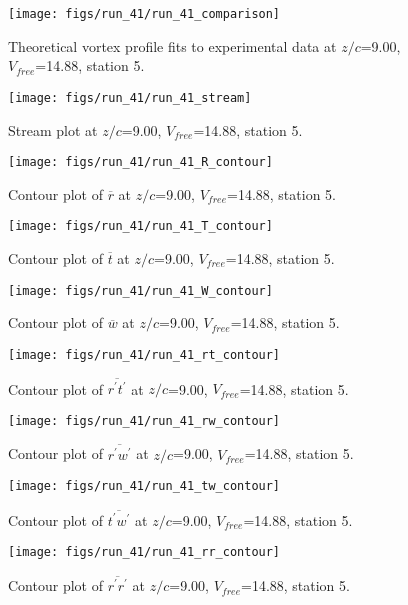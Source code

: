 \begin{figure}[H]
\centering
\texttt{[image: figs/run\_41/run\_41\_comparison]}
\caption{Theoretical vortex profile fits to experimental data at $z/c$=9.00, $V_{free}$=14.88, station 5.}
\end{figure}


\begin{figure}[H]
\centering
\texttt{[image: figs/run\_41/run\_41\_stream]}
\caption{Stream plot at $z/c$=9.00, $V_{free}$=14.88, station 5.}
\end{figure}


\begin{figure}[H]
\centering
\texttt{[image: figs/run\_41/run\_41\_R\_contour]}
\caption{Contour plot of $\overline{r}$ at $z/c$=9.00, $V_{free}$=14.88, station 5.}
\end{figure}


\begin{figure}[H]
\centering
\texttt{[image: figs/run\_41/run\_41\_T\_contour]}
\caption{Contour plot of $\overline{t}$ at $z/c$=9.00, $V_{free}$=14.88, station 5.}
\end{figure}


\begin{figure}[H]
\centering
\texttt{[image: figs/run\_41/run\_41\_W\_contour]}
\caption{Contour plot of $\overline{w}$ at $z/c$=9.00, $V_{free}$=14.88, station 5.}
\end{figure}


\begin{figure}[H]
\centering
\texttt{[image: figs/run\_41/run\_41\_rt\_contour]}
\caption{Contour plot of $\overline{r^\prime t^\prime}$ at $z/c$=9.00, $V_{free}$=14.88, station 5.}
\end{figure}


\begin{figure}[H]
\centering
\texttt{[image: figs/run\_41/run\_41\_rw\_contour]}
\caption{Contour plot of $\overline{r^\prime w^\prime}$ at $z/c$=9.00, $V_{free}$=14.88, station 5.}
\end{figure}


\begin{figure}[H]
\centering
\texttt{[image: figs/run\_41/run\_41\_tw\_contour]}
\caption{Contour plot of $\overline{t^\prime w^\prime}$ at $z/c$=9.00, $V_{free}$=14.88, station 5.}
\end{figure}


\begin{figure}[H]
\centering
\texttt{[image: figs/run\_41/run\_41\_rr\_contour]}
\caption{Contour plot of $\overline{r^\prime r^\prime}$ at $z/c$=9.00, $V_{free}$=14.88, station 5.}
\end{figure}


